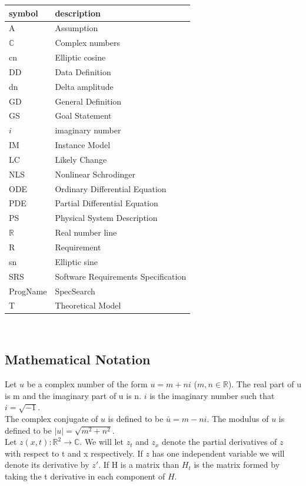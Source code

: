 \documentclass[12pt]{article}
\newcommand{\progname}{ProgName} %
\begin{document}
\renewcommand{\arraystretch}{1.2}
\begin{tabular}{l l} 
  \toprule		
  \textbf{symbol} & \textbf{description}\\
  \midrule 
  A & Assumption\\
  $\mathbb{C}$ & Complex numbers\\
  cn & Elliptic cosine \\
  DD & Data Definition\\
  dn & Delta amplitude \\
  GD & General Definition\\
  GS & Goal Statement\\
  $i$ & imaginary number\\
  IM & Instance Model\\
  LC & Likely Change\\
  NLS & Nonlinear Schrodinger\\
  ODE & Ordinary Differential Equation\\
  PDE & Partial Differential Equation\\
  PS & Physical System Description\\
  $\mathbb{R}$ & Real number line\\
  R & Requirement\\ 
  sn & Elliptic sine\\
  SRS & Software Requirements Specification\\
  \progname{} & SpecSearch\\
  T & Theoretical Model\\  
  \bottomrule
\end{tabular}\\

\subsection{Mathematical Notation}

Let $u$ be a complex number of the form $u= m + ni$ ($m,n \in 
\mathbb{R}$). The real part of u is m and the imaginary part of u is n. $i$ is 
the imaginary number such that $i=\sqrt{-1}$.\\

The complex 
conjugate of $u$ is defined to be $\bar{u}= m - ni$. 
The modulus of $u$ is defined to be $|u| = \sqrt{m^{2}+n^{2}}$.\\

Let $z(x,t): \mathbb{R}^{2} \rightarrow \mathbb{C}$. We will let $z_{t}$ and 
$z_{x}$ denote 
the partial derivatives of $z$ with respect to t and x respectively. If $z$ has 
one independent 
variable we will denote its derivative by $z'$. If H is a matrix than $H_{t}$ 
is the 
matrix formed by taking the t derivative in each component of $H$.\\ 
\end{document}
